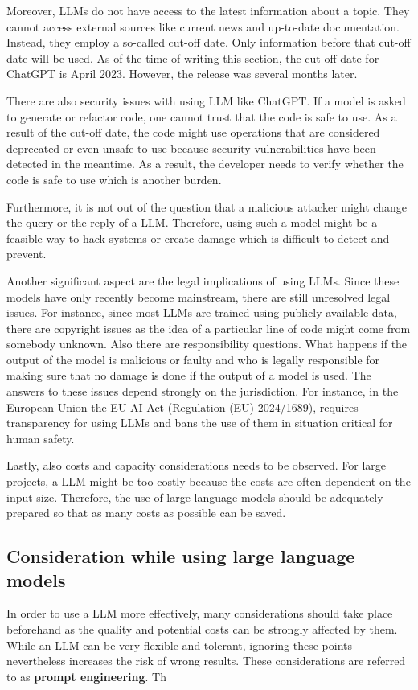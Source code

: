 Moreover, \ac{LLM}s do not have access to the latest information about a topic. They cannot access external sources like current news and up-to-date documentation. Instead, they employ a so-called cut-off date. Only information before that cut-off date will be used. As of the time of writing this section, the cut-off date for ChatGPT is April  2023. However, the release was several months later.  

There are also security issues with using  \ac{LLM} like ChatGPT. If a model is asked to generate or refactor code, one cannot trust that the code is safe to use. As a result of the cut-off date, the code might use operations that are considered deprecated or even unsafe to use because security vulnerabilities have been detected in the meantime. As a result, the developer needs to verify whether the code is safe to use which is another burden.  \cite{pearce2021asleep}

Furthermore, it is not out of the question that a malicious attacker might change the query or the reply of a \ac{LLM}. Therefore, using such a model might be a feasible way to hack systems or create damage which is difficult to detect and prevent. \cite{not_what_you_signed_for}

Another significant aspect are the legal implications of using \acp{LLM}. Since these models have only recently become mainstream, there are still unresolved legal issues. For instance, since most \acp{LLM} are trained using publicly available data, there are copyright issues as the idea of a particular line of code might come from somebody unknown. Also there are responsibility questions. What happens if the output of the model is malicious or faulty and who is legally responsible for making sure that no damage is done if the output of a model is used. The answers to these issues depend strongly on the jurisdiction. For instance, in the European Union the EU AI Act (Regulation (EU) 2024/1689), requires  transparency for using \acp{LLM} and bans the use of them in situation critical for human safety.  \cite{eu-ai-act}


Lastly, also costs and capacity considerations needs to be observed. For large projects, a \ac{LLM} might be too costly because  the costs are often dependent on the input size. Therefore, the use of large language models should be adequately prepared so that as many costs as possible can be saved.  \cite{chen2023frugalgpt}




\subsection{Consideration while using large language models}
In order to use a \ac{LLM} more effectively, many considerations should take place beforehand as the quality and potential costs can be strongly affected by them. While an \ac{LLM} can be very flexible and tolerant, ignoring these points nevertheless increases the risk of wrong results. These considerations are  referred to as \textbf{prompt engineering}. Th

